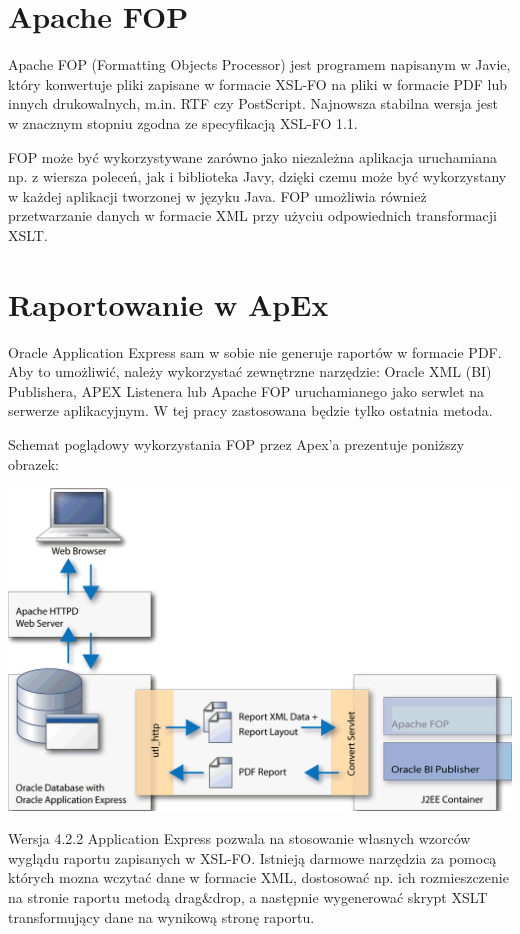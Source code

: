 \documentclass[11pt,a4paper]{article}
\begin{document}
\section{Apache FOP}\label{sec:fop}
Apache FOP (Formatting Objects Processor) jest programem napisanym w Javie, który konwertuje pliki zapisane w formacie XSL-FO na pliki w formacie PDF lub innych drukowalnych, m.in. RTF czy PostScript. Najnowsza stabilna wersja jest w znacznym stopniu zgodna ze specyfikacją XSL-FO 1.1. 

FOP może być wykorzystywane zarówno jako niezależna aplikacja uruchamiana np. z wiersza poleceń, jak i biblioteka Javy, dzięki czemu może być wykorzystany w każdej aplikacji tworzonej w języku Java. FOP umożliwia również przetwarzanie danych w formacie XML przy użyciu odpowiednich transformacji XSLT.

\section{Raportowanie w ApEx}\label{sec:raporapex}
Oracle Application Express sam w sobie nie generuje raportów w formacie PDF. Aby to umożliwić, należy wykorzystać zewnętrzne narzędzie: Oracle XML (BI) Publishera, APEX Listenera lub Apache FOP uruchamianego jako serwlet na serwerze aplikacyjnym. W tej pracy zastosowana będzie tylko ostatnia metoda.

Schemat poglądowy wykorzystania FOP przez Apex'a prezentuje poniższy obrazek:

\includegraphics[scale=0.5]{apex_fop_usage}


Wersja 4.2.2 Application Express pozwala na stosowanie własnych wzorców wyglądu raportu zapisanych w XSL-FO. Istnieją darmowe narzędzia za pomocą których mozna wczytać dane w formacie XML, dostosować np. ich rozmieszczenie na stronie raportu metodą drag\&drop, a następnie wygenerować skrypt XSLT transformujący dane na wynikową stronę raportu. 
\end{document}
